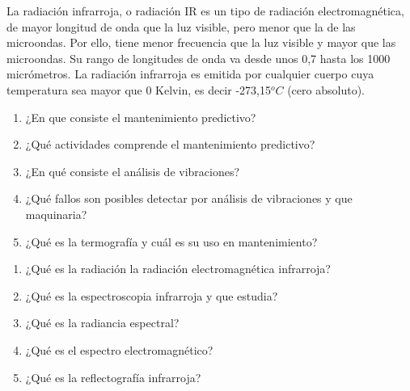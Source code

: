 La radiación infrarroja, o radiación IR es un tipo de radiación electromagnética, de mayor longitud de onda que la luz visible, pero menor que la de las microondas. Por ello, tiene menor frecuencia que la luz visible y mayor que las microondas. Su rango de longitudes de onda va desde unos 0,7 hasta los 1000 micrómetros. La radiación infrarroja es emitida por cualquier cuerpo cuya temperatura sea mayor que 0 Kelvin, es decir -273,15$^oC$ (cero absoluto).


\newpage

\begin{enumerate}
    \item ¿En que consiste el mantenimiento predictivo?
    \item ¿Qué actividades comprende el mantenimiento predictivo?
    \item ¿En qué consiste el análisis de vibraciones?
    \item ¿Qué fallos son posibles detectar por análisis de vibraciones y que maquinaria?
    \item ¿Qué es la termografía y cuál es su uso en mantenimiento?
\end{enumerate}
\begin{enumerate}
     \item ¿Qué es la radiación la radiación electromagnética infrarroja?
     \item ¿Qué es la espectroscopia infrarroja y que estudia?
     \item ¿Qué es la radiancia espectral?
     \item ¿Qué es el espectro electromagnético?
     \item ¿Qué es la reflectografía infrarroja?
    
\end{enumerate}
